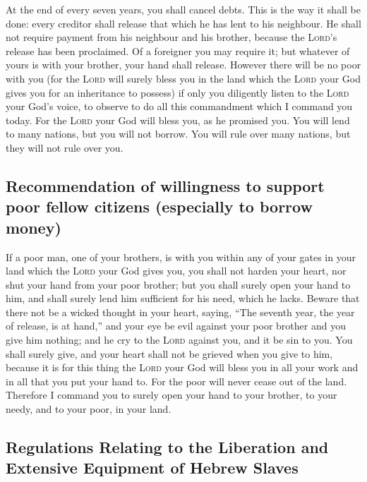  At the end of every seven years, you shall cancel debts.
 This is the way it shall be done: every creditor shall
release that which he has lent to his neighbour. He shall not require
payment from his neighbour and his brother, because the \textsc{Lord}'s
release has been proclaimed.  Of a foreigner you may
require it; but whatever of yours is with your brother, your hand shall
release.  However there will be no poor with you (for the
\textsc{Lord} will surely bless you in the land which the \textsc{Lord}
your God gives you for an inheritance to possess)  if only
you diligently listen to the \textsc{Lord} your God's voice, to observe
to do all this commandment which I command you today.  For
the \textsc{Lord} your God will bless you, as he promised you. You will
lend to many nations, but you will not borrow. You will rule over many
nations, but they will not rule over you.

\hypertarget{recommendation-of-willingness-to-support-poor-fellow-citizens-especially-to-borrow-money}{%
\subsection{Recommendation of willingness to support poor fellow
citizens (especially to borrow
money)}\label{recommendation-of-willingness-to-support-poor-fellow-citizens-especially-to-borrow-money}}

 If a poor man, one of your brothers, is with you within
any of your gates in your land which the \textsc{Lord} your God gives
you, you shall not harden your heart, nor shut your hand from your poor
brother;  but you shall surely open your hand to him, and
shall surely lend him sufficient for his need, which he lacks.
 Beware that there not be a wicked thought in your heart,
saying, ``The seventh year, the year of release, is at hand,'' and your
eye be evil against your poor brother and you give him nothing; and he
cry to the \textsc{Lord} against you, and it be sin to you.
 You shall surely give, and your heart shall not be
grieved when you give to him, because it is for this thing the
\textsc{Lord} your God will bless you in all your work and in all that
you put your hand to.  For the poor will never cease out
of the land. Therefore I command you to surely open your hand to your
brother, to your needy, and to your poor, in your land.

\hypertarget{regulations-relating-to-the-liberation-and-extensive-equipment-of-hebrew-slaves}{%
\subsection{Regulations Relating to the Liberation and Extensive
Equipment of Hebrew
Slaves}\label{regulations-relating-to-the-liberation-and-extensive-equipment-of-hebrew-slaves}}

